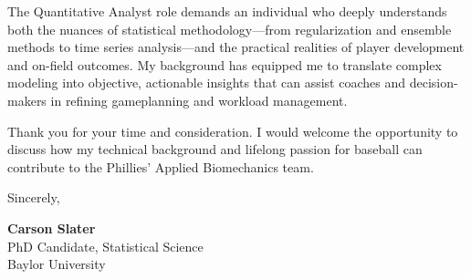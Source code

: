 \documentclass[11pt]{article}
\begin{document}
The Quantitative Analyst role demands an individual who deeply understands both the nuances of statistical methodology---from regularization and ensemble methods to time series analysis---and the practical realities of player development and on-field outcomes. My background has equipped me to translate complex modeling into objective, actionable insights that can assist coaches and decision-makers in refining gameplanning and workload management.

Thank you for your time and consideration. I would welcome the opportunity to discuss how my technical background and lifelong passion for baseball can contribute to the Phillies' Applied Biomechanics team.

\vspace{1em}
\noindent
Sincerely,

\vspace{1em}
\noindent
\textbf{Carson Slater} \\
PhD Candidate, Statistical Science \\
Baylor University
\end{document}
